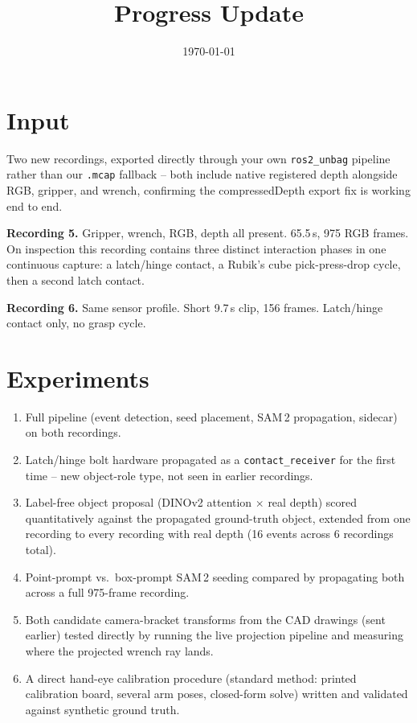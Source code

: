 \documentclass[11pt]{article}
\title{\textbf{Progress Update}}
\date{\today}
\begin{document}
\maketitle

\section{Input}

Two new recordings, exported directly through your own \texttt{ros2\_unbag}
pipeline rather than our \texttt{.mcap} fallback -- both include native
registered depth alongside RGB, gripper, and wrench, confirming the
compressedDepth export fix is working end to end.

\textbf{Recording 5.} Gripper, wrench, RGB, depth all present. 65.5\,s,
975 RGB frames. On inspection this recording contains three distinct
interaction phases in one continuous capture: a latch/hinge contact, a
Rubik's cube pick-press-drop cycle, then a second latch contact.

\textbf{Recording 6.} Same sensor profile. Short 9.7\,s clip, 156 frames.
Latch/hinge contact only, no grasp cycle.

\section{Experiments}

\begin{enumerate}[noitemsep]
  \item Full pipeline (event detection, seed placement, SAM\,2
        propagation, sidecar) on both recordings.
  \item Latch/hinge bolt hardware propagated as a \texttt{contact\_receiver}
        for the first time -- new object-role type, not seen in earlier
        recordings.
  \item Label-free object proposal (DINOv2 attention $\times$ real depth)
        scored quantitatively against the propagated ground-truth object,
        extended from one recording to every recording with real depth
        (16 events across 6 recordings total).
  \item Point-prompt vs.\ box-prompt SAM\,2 seeding compared by
        propagating both across a full 975-frame recording.
  \item Both candidate camera-bracket transforms from the CAD drawings
        (sent earlier) tested directly by running the live projection
        pipeline and measuring where the projected wrench ray lands.
  \item A direct hand-eye calibration procedure (standard method: printed
        calibration board, several arm poses, closed-form solve) written
        and validated against synthetic ground truth.
\end{enumerate}
\end{document}
